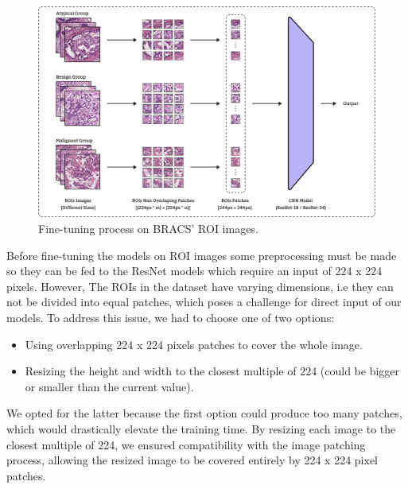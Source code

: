 \documentclass[
11pt, %
english, %
singlespacing, %
headsepline, %
]{project_structure}
\begin{document}
\begin{figure}[H]
    \centering
    \includegraphics[width=\textwidth]{figures/fine-tuning/fine_tuning.png}
    \caption{Fine-tuning process on \acrshort{BRACS}' \acrshort{ROI} images.}
    \label{fig:fine_tuning}
\end{figure}


\noindent Before fine-tuning the models on \acrshort{ROI} images some preprocessing must be made so they can be fed to the \acrshort{ResNet} models which require an input of 224 x 224 pixels. However, The \acrshort{ROI}s in the dataset have varying dimensions, i.e they can not be divided into equal patches, which poses a challenge for direct input of our models. To address this issue, we had to choose one of two options:
\begin{itemize}
    \item Using overlapping 224 x 224 pixels patches to cover the whole image.
    \item Resizing the height and width to the closest multiple of 224 (could be bigger or smaller than the current value).
\end{itemize}
\noindent We opted for the latter because the first option could produce too many patches, which would drastically elevate the training time. By resizing each image to the closest multiple of 224, we ensured compatibility with the image patching process, allowing the resized image to be covered entirely by 224 x 224 pixel patches.\\
\end{document}
